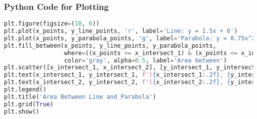\documentclass{beamer}
\theoremstyle{remark}
\numberwithin{equation}{section}
\begin{document}
\begin{frame}[fragile]
\frametitle{Python Code for Plotting}
\begin{lstlisting}[language=Python]
plt.figure(figsize=(10, 6))
plt.plot(x_points, y_line_points, 'r', label='Line: y = 1.5x + 6')
plt.plot(x_points, y_parabola_points, 'g', label='Parabola: y = 0.75x^2')
plt.fill_between(x_points, y_line_points, y_parabola_points, 
                 where=((x_points >= x_intersect_1) & (x_points <= x_intersect_2)),
                 color='gray', alpha=0.5, label='Area between')
plt.scatter([x_intersect_1, x_intersect_2], [y_intersect_1, y_intersect_2], color='blue', s=100, zorder=5)
plt.text(x_intersect_1, y_intersect_1, f'({x_intersect_1:.2f}, {y_intersect_1:.2f})', fontsize=12, ha='right')
plt.text(x_intersect_2, y_intersect_2, f'({x_intersect_2:.2f}, {y_intersect_2:.2f})', fontsize=12, ha='left')
plt.legend()
plt.title('Area Between Line and Parabola')
plt.grid(True)
plt.show()

\end{lstlisting}
\end{frame}
\end{document}

